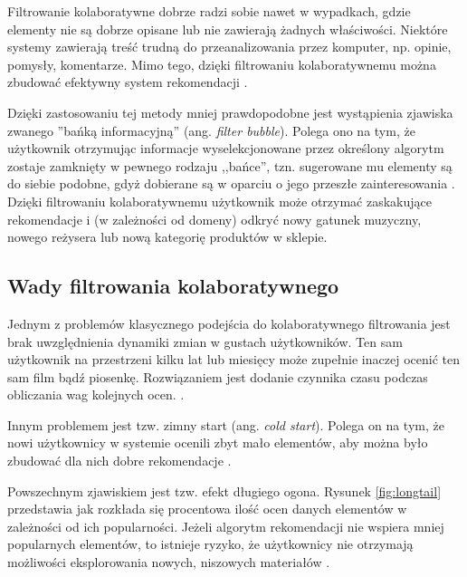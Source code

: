 \documentclass[twoside]{iisthesis}
\begin{document}
	  Filtrowanie kolaboratywne dobrze radzi sobie nawet w wypadkach, gdzie elementy nie są dobrze opisane lub nie zawierają żadnych właściwości. Niektóre systemy zawierają treść trudną do przeanalizowania przez komputer, np. opinie, pomysły, komentarze. Mimo tego, dzięki filtrowaniu kolaboratywnemu można zbudować efektywny system rekomendacji \cite{melville2002content}.
	  
	  Dzięki zastosowaniu tej metody mniej prawdopodobne jest wystąpienia zjawiska zwanego ''bańką informacyjną'' (ang. \textit{filter bubble}). Polega ono na tym, że użytkownik otrzymując informacje wyselekcjonowane przez określony algorytm zostaje zamknięty w pewnego rodzaju ,,bańce'', tzn. sugerowane mu elementy są do siebie podobne, gdyż dobierane są w oparciu o jego przeszłe zainteresowania \cite{pariser2011filter}. Dzięki filtrowaniu kolaboratywnemu użytkownik może otrzymać zaskakujące rekomendacje i (w zależności od domeny) odkryć nowy gatunek muzyczny, nowego reżysera lub nową kategorię produktów w sklepie.	 
	  
	  \subsection{Wady filtrowania kolaboratywnego}
	  
	  Jednym z problemów klasycznego podejścia do kolaboratywnego filtrowania jest brak uwzględnienia dynamiki zmian w gustach użytkowników. Ten sam użytkownik na przestrzeni kilku lat lub miesięcy może zupełnie inaczej ocenić ten sam film bądź piosenkę. Rozwiązaniem jest dodanie czynnika czasu podczas obliczania wag kolejnych ocen. \cite{id:NewRecommentationAlgoritmBasedOnSocialNetwork,id:NextSongRecommendationWithTemporalDynamics,koren2009matrix}.
	  
	  Innym problemem jest tzw. zimny start (ang. \textit{cold start}). Polega on na tym, że nowi użytkownicy w systemie ocenili zbyt mało elementów, aby można było zbudować dla nich dobre rekomendacje \cite{id:RubensRecSysHB2010,id:zhang2015hybrid}.
	  
	  Powszechnym zjawiskiem jest tzw. efekt długiego ogona. Rysunek \ref{fig:longtail} przedstawia jak rozkłada się procentowa ilość ocen danych elementów w zależności od ich popularności. Jeżeli algorytm rekomendacji nie wspiera mniej popularnych elementów, to istnieje ryzyko, że użytkownicy nie otrzymają możliwości eksplorowania nowych, niszowych materiałów \cite{id:celma2010music,id:RubensRecSysHB2010}.
	  
\end{document}
